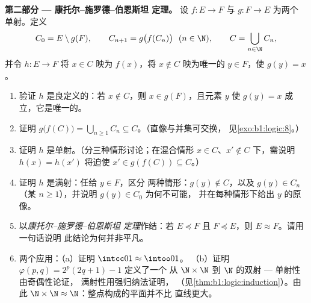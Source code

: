 \begin{problem}
\medskip
\noindent\textbf{第二部分 --- 康托尔--施罗德--伯恩斯坦
定理。} 设 $f \colon E \to F$ 与 $g \colon F \to E$ 为两个
单射。定义
\[
C_0 = E \setminus g(F), \qquad C_{n+1} = g\bigl(f(C_n)\bigr)
\ \ (n \in \N), \qquad C = \bigcup_{n \in \N} C_n,
\]
并令 $h \colon E \to F$ 将 $x \in C$ 映为 $f(x)$，将 $x \notin C$
映为唯一的 $y \in F$，使 $g(y) = x$。
\begin{enumerate}[resume]
  \item 验证 $h$ 是良定义的：若 $x \notin C$，则 $x \in
        g(F)$，且元素 $y$ 使 $g(y) = x$ 成立，它是唯一的。
  \item 证明 $g\bigl(f(C)\bigr) = \bigcup_{n \geq 1} C_n
        \subseteq C$。（直像与并集可交换，
        见\cref{exo:b1:logic:8}。）
  \item 证明 $h$ 是单射。（分三种情形讨论；在混合情形
        $x \in C$、$x' \notin C$ 下，需说明 $h(x) = h(x')$
        将迫使 $x' \in g(f(C)) \subseteq C$。）
  \item 证明 $h$ 是满射：任给 $y \in F$，区分
        两种情形：$g(y) \notin C$，以及 $g(y) \in C_n$（某 $n
        \geq 1$），并说明 $g(y) \in C_0$ 为何不可能，
        并在每种情形下给出 $y$ 的原像。
  \item 以\emph{康托尔--施罗德--伯恩斯坦
        定理}作结：若 $E \preceq F$ 且 $F \preceq E$，则 $E
        \approx F$。请用一句话说明
        此结论为何并非平凡。
  \item 两个应用：（a）证明 $\intcc01 \approx \intoo01$。
        （b）证明 $\varphi(p, q) = 2^p(2q + 1) - 1$ 定义了一个
        从 $\N \times \N$ 到 $\N$ 的双射 --- 单射性由奇偶性论证，
        满射性用强归纳法证明，
        （见\cref{thm:b1:logic:induction}）。由此 $\N \times \N \approx
        \N$：整点构成的平面并不比
        直线更大。
\end{enumerate}


\end{problem}
